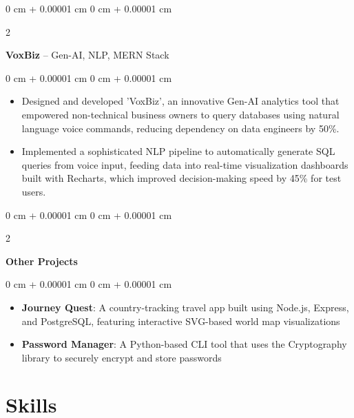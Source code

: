 \documentclass[10pt, letterpaper]{article}
\newenvironment{highlights}{
    \begin{itemize}[
        topsep=0.10 cm,
        parsep=0.10 cm,
        partopsep=0pt,
        itemsep=0pt,
        leftmargin=0 cm + 10pt
    ]
}{
    \end{itemize}
} %
\newenvironment{onecolentry}{
    \begin{adjustwidth}{
        0 cm + 0.00001 cm
    }{
        0 cm + 0.00001 cm
    }
}{
    \end{adjustwidth}
} %
\newenvironment{twocolentry}[2][]{
    \onecolentry
    \def\secondColumn{#2}
    \setcolumnwidth{\fill, 4.5 cm}
    \begin{paracol}{2}
}{
    \switchcolumn \raggedleft \secondColumn
    \end{paracol}
    \endonecolentry
} %
\begin{document}
        \vspace{0.2 cm}

        \begin{twocolentry}{
            \href{https://github.com/ritheshan/VoxBiz}{\faGithub}
        }
            \textbf{VoxBiz} -- Gen-AI, NLP, MERN Stack\end{twocolentry}

        \vspace{0.10 cm}
        \begin{onecolentry}
            \begin{highlights}
                \item Designed and developed 'VoxBiz', an innovative Gen-AI analytics tool that empowered non-technical business owners to query databases using natural language voice commands, reducing dependency on data engineers by 50\%.
                \item Implemented a sophisticated NLP pipeline to automatically generate SQL queries from voice input, feeding data into real-time visualization dashboards built with Recharts, which improved decision-making speed by 45\% for test users.
            \end{highlights}
        \end{onecolentry}

        \vspace{0.2 cm}

        \begin{twocolentry}{
            \href{https://github.com/ritheshan}{\faGithub}
        }
            \textbf{Other Projects}\end{twocolentry}

        \vspace{0.10 cm}
        \begin{onecolentry}
            \begin{highlights}
                \item \textbf{Journey Quest}: A country-tracking travel app built using Node.js, Express, and PostgreSQL, featuring interactive SVG-based world map visualizations
                \item \textbf{Password Manager}: A Python-based CLI tool that uses the Cryptography library to securely encrypt and store passwords
            \end{highlights}
        \end{onecolentry}

    \section{Skills}
\end{document}
